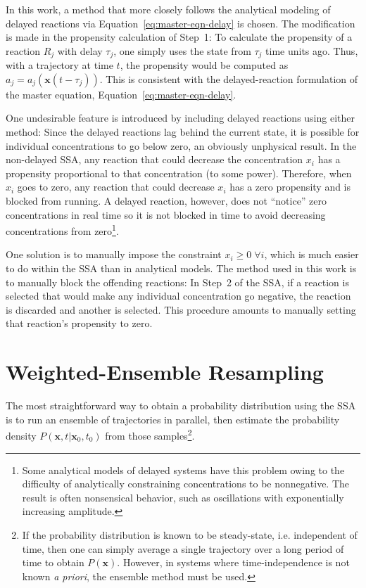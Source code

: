 \documentclass[english,letterpaper,12pt]{report}
\renewcommand{\vec}[1]{\ensuremath{\mathbf{#1}}}
\newcommand{\delaytime}{\ensuremath{\tau}}
\begin{document}
\begin{doublespacing}
In this work, a method that more closely follows the analytical modeling of delayed reactions via Equation~\eqref{eq:master-eqn-delay} is chosen. The modification is made in the propensity calculation of Step~1: To calculate the propensity of a reaction $R_j$ with delay $\delaytime_j$, one simply uses the state from $\delaytime_j$ time units ago. Thus, with a trajectory at time $t$, the propensity would be computed as $a_j = a_j\left(\vec{x}(t - \delaytime_j)\right)$. This is consistent with the delayed-reaction formulation of the master equation, Equation~\eqref{eq:master-eqn-delay}.

One undesirable feature is introduced by including delayed reactions using either method: Since the delayed reactions lag behind the current state, it is possible for individual concentrations to go below zero, an obviously unphysical result. In the non-delayed SSA, any reaction that could decrease the concentration $x_i$ has a propensity proportional to that concentration (to some power). Therefore, when $x_i$ goes to zero, any reaction that could decrease $x_i$ has a zero propensity and is blocked from running. A delayed reaction, however, does not ``notice'' zero concentrations in real time so it is not blocked in time to avoid decreasing concentrations from zero\footnote{Some analytical models of delayed systems have this problem owing to the difficulty of analytically constraining concentrations to be nonnegative. The result is often nonsensical behavior, such as oscillations with exponentially increasing amplitude.}.

One solution is to manually impose the constraint $x_i \geq 0\; \forall i$, which is much easier to do within the SSA than in analytical models. The method used in this work is to manually block the offending reactions: In Step~2 of the SSA, if a reaction is selected that would make any individual concentration go negative, the reaction is discarded and another is selected. This procedure amounts to manually setting that reaction's propensity to zero.


\section{Weighted-Ensemble Resampling} %
\label{sub:we-resampling-intro}

The most straightforward way to obtain a probability distribution using the SSA is to run an ensemble of trajectories in parallel, then estimate the probability density $P(\vec{x}, t | \vec{x}_0, t_0)$ from those samples\footnote{If the probability distribution is known to be steady-state, i.e. independent of time, then one can simply average a single trajectory over a long period of time to obtain $P(\vec{x})$. However, in systems where time-independence is not known \textit{a priori}, the ensemble method must be used.}.


\end{doublespacing}
\end{document}
